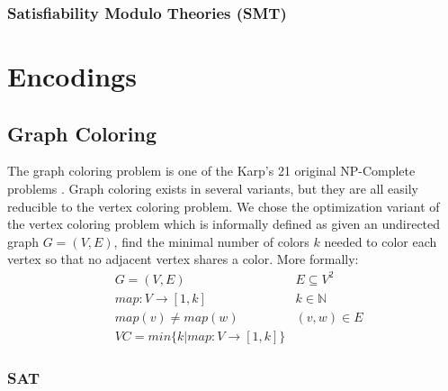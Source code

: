 \documentclass{sig-alternate}
\begin{document}
\subsubsection*{Satisfiability Modulo Theories (SMT)}

\section{Encodings}

\subsection{Graph Coloring}

The graph coloring problem is one of the Karp's 21 original NP-Complete problems \cite{karp1972reducibility}.
Graph coloring exists in several variants, but they are all easily reducible to the vertex coloring problem. We chose the optimization variant of the vertex coloring problem which is informally defined as given an undirected graph $G = (V,E)$, find the minimal number of colors $k$ needed to color each vertex so that no adjacent vertex shares a color. More formally:
\begin{subequations}
\begin{align*}
        & G = (V,E) & E \subseteq V^2\\
        & map : V \rightarrow [1,k] & k \in \mathbb{N} \\
        & map(v) \neq map(w) & (v,w) \in E \\
        & VC = min\{k | map : V \rightarrow [1,k]\}
\end{align*}
\end{subequations}


\subsubsection{SAT}
\end{document}

